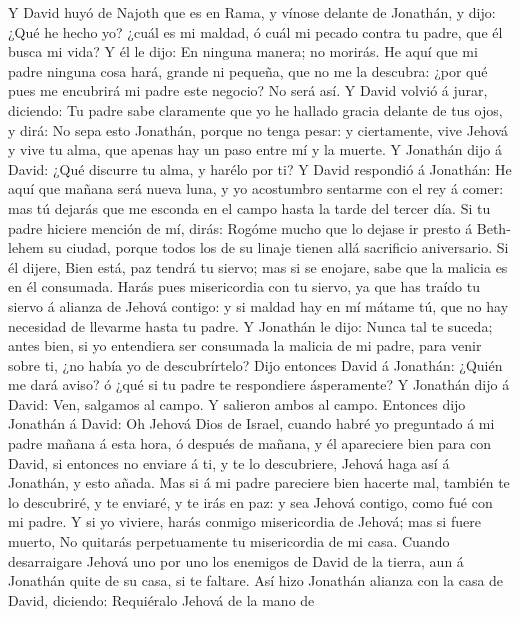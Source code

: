  Y David huyó de Najoth que es en Rama, y vínose delante
de Jonathán, y dijo: ¿Qué he hecho yo? ¿cuál es mi maldad, ó cuál mi
pecado contra tu padre, que él busca mi vida?  Y él le
dijo: En ninguna manera; no morirás. He aquí que mi padre ninguna cosa
hará, grande ni pequeña, que no me la descubra: ¿por qué pues me
encubrirá mi padre este negocio? No será así.  Y David
volvió á jurar, diciendo: Tu padre sabe claramente que yo he hallado
gracia delante de tus ojos, y dirá: No sepa esto Jonathán, porque no
tenga pesar: y ciertamente, vive Jehová y vive tu alma, que apenas hay
un paso entre mí y la muerte.  Y Jonathán dijo á David:
¿Qué discurre tu alma, y harélo por ti?  Y David respondió
á Jonathán: He aquí que mañana será nueva luna, y yo acostumbro sentarme
con el rey á comer: mas tú dejarás que me esconda en el campo hasta la
tarde del tercer día.  Si tu padre hiciere mención de mí,
dirás: Rogóme mucho que lo dejase ir presto á Beth-lehem su ciudad,
porque todos los de su linaje tienen allá sacrificio aniversario.
 Si él dijere, Bien está, paz tendrá tu siervo; mas si se
enojare, sabe que la malicia es en él consumada.  Harás
pues misericordia con tu siervo, ya que has traído tu siervo á alianza
de Jehová contigo: y si maldad hay en mí mátame tú, que no hay necesidad
de llevarme hasta tu padre.  Y Jonathán le dijo: Nunca tal
te suceda; antes bien, si yo entendiera ser consumada la malicia de mi
padre, para venir sobre ti, ¿no había yo de descubrírtelo?
 Dijo entonces David á Jonathán: ¿Quién me dará aviso? ó
¿qué si tu padre te respondiere ásperamente?  Y Jonathán
dijo á David: Ven, salgamos al campo. Y salieron ambos al campo.
 Entonces dijo Jonathán á David: Oh Jehová Dios de
Israel, cuando habré yo preguntado á mi padre mañana á esta hora, ó
después de mañana, y él apareciere bien para con David, si entonces no
enviare á ti, y te lo descubriere,  Jehová haga así á
Jonathán, y esto añada. Mas si á mi padre pareciere bien hacerte mal,
también te lo descubriré, y te enviaré, y te irás en paz: y sea Jehová
contigo, como fué con mi padre.  Y si yo viviere, harás
conmigo misericordia de Jehová; mas si fuere muerto,  No
quitarás perpetuamente tu misericordia de mi casa. Cuando desarraigare
Jehová uno por uno los enemigos de David de la tierra, aun á Jonathán
quite de su casa, si te faltare.  Así hizo Jonathán
alianza con la casa de David, diciendo: Requiéralo Jehová de la mano de
